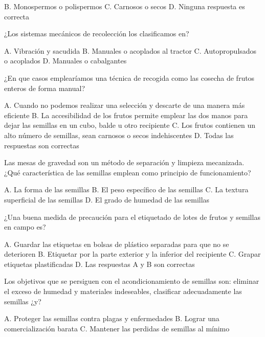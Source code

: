 \documentclass[11pt]{exam}
\begin{document}
{\begin{questions}
\begin{checkboxes}
    \choice B. Monospermos o polispermos
    \choice C. Carnosos o secos
    \choice D. Ninguna respuesta es correcta
  \end{checkboxes}
  \newpage
\question ¿Los sistemas mecánicos de recolección los clasificamos en?
  \begin{checkboxes}
    \CorrectChoice A. Vibración y sacudida
    \choice B. Manuales o acoplados al tractor
    \choice C. Autopropulsados o acoplados
    \choice D. Manuales o cabalgantes
  \end{checkboxes}
\question ¿En que casos emplearíamos una técnica de recogida como las cosecha de
  frutos enteros de forma manual?
  \begin{checkboxes}
    \choice A. Cuando no podemos realizar una selección y descarte de una manera
    más eficiente
    \choice B. La accesibilidad de los frutos permite emplear las dos manos para dejar las
    semillas en un cubo, balde u otro recipiente 
    \choice C. Los frutos contienen un alto número de semillas, sean carnosos o
    secos indehiscentes
    \CorrectChoice D. Todas las respuestas son correctas 
  \end{checkboxes}
\question Las mesas de gravedad son un método de separación y limpieza mecanizada. ¿Qué
  característica de las semillas emplean como principio de funcionamiento?
  \begin{checkboxes}
    \choice A. La forma de las semillas
    \CorrectChoice B. El peso específico de las semillas
    \choice C. La textura superficial de las semillas
    \choice D. El grado de humedad de las semillas
  \end{checkboxes}
\question ¿Una buena medida de precaución para el etiquetado de lotes de frutos y semillas
  en campo es?
  \begin{checkboxes}
    \choice A. Guardar las etiquetas en bolsas de plástico separadas para que no se
    deterioren
    \CorrectChoice B. Etiquetar por la parte exterior y la inferior del recipiente
    \choice C. Grapar etiquetas plastificadas
    \choice D. Las respuestas A y B son correctas
  \end{checkboxes}
\question Los objetivos que se persiguen con el acondicionamiento de semillas son:
  eliminar el exceso de humedad y materiales indeseables, clasificar adecuadamente las
  semillas ¿y?
  \begin{checkboxes}
    \CorrectChoice A. Proteger las semillas contra plagas y enfermedades
    \choice B. Lograr una comercialización barata
    \choice C. Mantener las perdidas de semillas al mínimo

\end{checkboxes}
\end{questions}}
\end{document}
